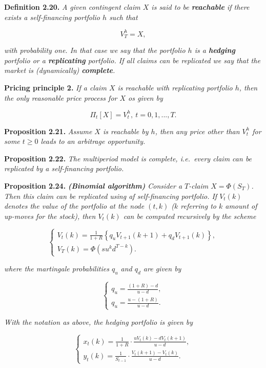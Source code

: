 \documentclass[
]{article}
\begin{document}
\textbf{Definition 2.20.} \emph{A given contingent claim \(X\) is said
to be \textbf{reachable} if there exists a self-financing portfolio
\(h\) such that}

\[
V_T^h=X,
\]

\emph{with probability one. In that case we say that the portfolio \(h\)
is a \textbf{hedging} portfolio or a \textbf{replicating} portfolio. If
all claims can be replicated we say that the market is
\emph{(dynamically)} \textbf{complete}.}

\textbf{Pricing principle 2.} \emph{If a claim \(X\) is reachable with
replicating portfolio \(h\), then the only reasonable price process for
\(X\) os given by}

\[
\Pi_t[X]=V_t^h,\ t=0,1,...,T.
\]

\textbf{Proposition 2.21.} \emph{Assume \(X\) is reachable by \(h\),
then any price other than \(V_t^h\) for some \(t\ge 0\) leads to an
arbitrage opportunity.}

\textbf{Proposition 2.22.} \emph{The multiperiod model is complete,
i.e.~every claim can be replicated by a self-financing portfolio.}

\textbf{Proposition 2.24.} \emph{\textbf{(Binomial algorithm)} Consider
a \(T\)-claim \(X=\Phi(S_T)\). Then this claim can be replicated using
af self-financing portfolio. If \(V_t(k)\) denotes the value of the
portfolio at the node \((t,k)\) (\(k\) referring to \(k\) amount of
up-moves for the stock), then \(V_t(k)\) can be computed recursively by
the scheme}

\[
\left\{\begin{matrix}V_t(k)=\frac{1}{1+R}\left\{q_uV_{t+1}(k+1)+q_dV_{t+1}(k)\right\},\\ V_T(k)=\Phi(su^kd^{T-k}).\end{matrix}\right.
\]

\emph{where the martingale probabilities \(q_u\) and \(q_d\) are given
by}

\[
\left\{\begin{matrix}q_u=\frac{(1+R)-d}{u-d},\\ q_u=\frac{u-(1+R)}{u-d}.\end{matrix}\right.
\]

\emph{With the notation as above, the hedging portfolio is given by}

\[
\left\{\begin{matrix}x_t(k)=\frac{1}{1+R}\cdot\frac{uV_t(k)-dV_t(k+1)}{u-d},\\ y_t(k)=\frac{1}{S_{t-1}}\cdot\frac{V_t(k+1)-V_t(k)}{u-d}.\end{matrix}\right.
\]
\end{document}
